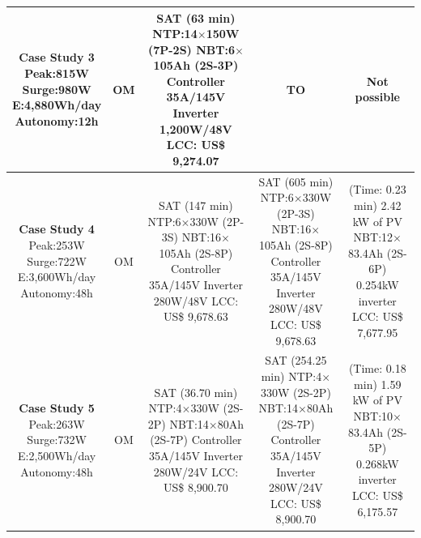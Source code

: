 \documentclass[runningheads]{llncs}
\begin{document}
\begin{table}
\begin{scriptsize}
\begin{tabular}{c|c|c|c|c}
\hline
\makecell{\textbf{Case Study 3}\\Peak:815W\\Surge:980W\\E:4,880Wh/day\\Autonomy:12h} & OM & \makecell{SAT (63 min) \\NTP:14$\times$150W (7P-2S)\\NBT:6$\times$105Ah (2S-3P)\\Controller 35A/145V\\Inverter 1,200W/48V\\LCC: US\$ 9,274.07} & TO & Not possible \\
\hline
\makecell{\textbf{Case Study 4}\\Peak:253W\\Surge:722W\\E:3,600Wh/day\\Autonomy:48h} & OM & \makecell{SAT (147 min) \\NTP:6$\times$330W (2P-3S)\\NBT:16$\times$105Ah (2S-8P)\\Controller 35A/145V\\Inverter 280W/48V\\LCC: US\$ 9,678.63} & \makecell{SAT (605 min) \\NTP:6$\times$330W (2P-3S)\\NBT:16$\times$105Ah (2S-8P)\\Controller 35A/145V\\Inverter 280W/48V\\LCC: US\$ 9,678.63} & \makecell{(Time: 0.23 min)\\2.42 kW of PV\\NBT:12$\times$83.4Ah (2S-6P)\\0.254kW inverter\\LCC: US\$ 7,677.95}\\
\hline
\makecell{\textbf{Case Study 5}\\Peak:263W\\Surge:732W\\E:2,500Wh/day\\Autonomy:48h} & OM & \makecell {SAT (36.70 min) \\NTP:4$\times$330W (2S-2P)\\NBT:14$\times$80Ah (2S-7P)\\Controller 35A/145V\\Inverter 280W/24V \\LCC: US\$ 8,900.70} & \makecell {SAT (254.25 min) \\NTP:4$\times$330W (2S-2P)\\NBT:14$\times$80Ah (2S-7P)\\Controller 35A/145V\\Inverter 280W/24V \\LCC: US\$ 8,900.70} & \makecell{(Time: 0.18 min)\\1.59 kW of PV\\NBT:10$\times$83.4Ah (2S-5P)\\0.268kW inverter\\LCC: US\$ 6,175.57} \\

\end{tabular}
\end{scriptsize}
\end{table}
\end{document}
